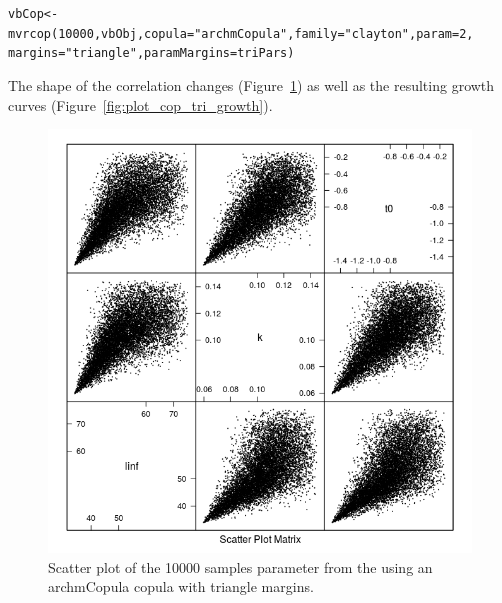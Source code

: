 \documentclass[a4paper,english,10pt]{article}\usepackage[]{graphicx}\usepackage[]{color}
\makeatletter
\newcommand{\hlnum}[1]{\textcolor[rgb]{0.063,0.58,0.627}{#1}}%
\newcommand{\hlstr}[1]{\textcolor[rgb]{0.063,0.58,0.627}{#1}}%
\newcommand{\hlstd}[1]{\textcolor[rgb]{0.196,0.196,0.196}{#1}}%
\newcommand{\hlkwb}[1]{\textcolor[rgb]{0.627,0,0.314}{#1}}%
\newcommand{\hlkwc}[1]{\textcolor[rgb]{0,0.631,0.314}{#1}}%
\newcommand{\hlkwd}[1]{\textcolor[rgb]{0.78,0.227,0.412}{#1}}%
\newenvironment{kframe}{%
 \def\at@end@of@kframe{}%
 \ifinner\ifhmode%
  \def\at@end@of@kframe{\end{minipage}}%
  \begin{minipage}{\columnwidth}%
 \fi\fi%
 \def\FrameCommand##1{\hskip\@totalleftmargin \hskip-\fboxsep
 \colorbox{shadecolor}{##1}\hskip-\fboxsep
     \hskip-\linewidth \hskip-\@totalleftmargin \hskip\columnwidth}%
 \MakeFramed {\advance\hsize-\width
   \@totalleftmargin\z@ \linewidth\hsize
   \@setminipage}}%
 {\par\unskip\endMakeFramed%
 \at@end@of@kframe}
\newenvironment{knitrout}{}{} %
\makeatother
\begin{document}

\begin{knitrout}
\color{fgcolor}\begin{kframe}
\begin{alltt}
\hlstd{vbCop} \hlkwb{<-} \hlkwd{mvrcop}\hlstd{(}\hlnum{10000}\hlstd{, vbObj,} \hlkwc{copula} \hlstd{=} \hlstr{"archmCopula"}\hlstd{,} \hlkwc{family} \hlstd{=} \hlstr{"clayton"}\hlstd{,} \hlkwc{param} \hlstd{=} \hlnum{2}\hlstd{,}
    \hlkwc{margins} \hlstd{=} \hlstr{"triangle"}\hlstd{,} \hlkwc{paramMargins} \hlstd{= triPars)}
\end{alltt}
\end{kframe}
\end{knitrout}

The shape of the correlation changes (Figure~\ref{fig:plot_cop_tri_scatter}) as well as the resulting growth curves (Figure~\ref{fig:plot_cop_tri_growth}). 

\begin{knitrout}
\color{fgcolor}\begin{figure}[H]

{\centering \includegraphics[width=.9\linewidth]{figure/plot_cop_tri_scatter-1} 

}

\caption[Scatter plot of the 10000 samples parameter from the using an archmCopula copula with triangle margins]{Scatter plot of the 10000 samples parameter from the using an archmCopula copula with triangle margins.}\label{fig:plot_cop_tri_scatter}
\end{figure}


\end{knitrout}
\end{document}
